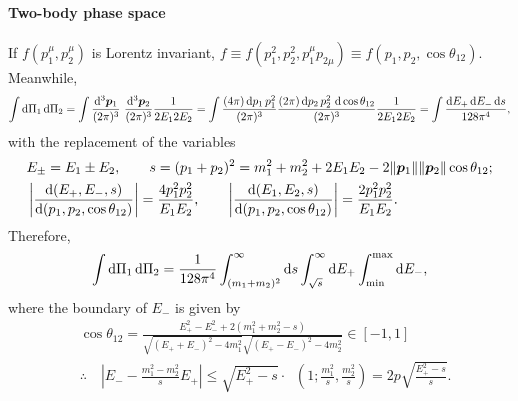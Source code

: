 \documentclass[CheatSheet]{subfiles}
\begin{document}
\paragraph{Two-body phase space}
If $f(p_1^\mu,p_2^\mu)$ is Lorentz invariant, $f\equiv f(p_1^2,p_2^2,p_1^\mu p_{2\mu})\equiv f(p_1,p_2,\cos\theta_{12})$.
Meanwhile,
\begin{equation}
 \int\dd\Pi_1\dd\Pi_2
=
\int\ddP{p_1}\,\,\ddP{p_2}\frac{1}{2E_12E_2}
=
\int\frac{(4\pi)\dd p_1\,p_1^2}{(2\pi)^3}
\frac{(2\pi)\dd p_2\,p_2^2\,\dd\cos\theta_{12}}{(2\pi)^3}\frac{1}{2E_12E_2}
=
\int\frac{\dd E_+\dd E_- \dd s}{128\pi^4},
\end{equation}
with the replacement of the variables
\begin{align*}
& E_\pm = E_1\pm E_2,
\qquad
s=(p_1+p_2)^2=m_1^2 + m_2^2 + 2E_1E_2 - 2\|{\boldsymbol{p}}_1\|\|{\boldsymbol{p}}_2\|\cos\theta_{12};\\
&
\left|\frac{\mathop{}\!\mathrm{d}(E_+,E_-,s)}{\mathop{}\!\mathrm{d}(p_1, p_2, \cos\theta_{12})}\right|=\frac{4p_1^2p_2^2}{E_1E_2},
\qquad
\left|\frac{\mathop{}\!\mathrm{d}(E_1,E_2,s)}{\mathop{}\!\mathrm{d}(p_1, p_2, \cos\theta_{12})}\right|=\frac{2p_1^2p_2^2}{E_1E_2}.
\end{align*}
Therefore, 
\begin{equation}
 \int\mathop{}\!\mathrm{d}\Pi_1\mathop{}\!\mathrm{d}\Pi_2
=
\frac{1}{128\pi^4}
\int_{(m_1+m_2)^2}^\infty\mathop{}\!\mathrm{d} s
\int_{\sqrt{s}}^\infty\mathop{}\!\mathrm{d} E_+
\int_{\text{min}}^{\mathrm{max}}\mathop{}\!\mathrm{d} E_-,
\end{equation}
where the boundary of $E_-$ is given by
\begin{align*}
 &\cos\theta_{12}=\frac{E_+^2-E_-^2+2 \left(m_1^2+m_2^2-s\right)}{\sqrt{(E_++E_-)^2-4 m_1^2}\sqrt{(E_+-E_-)^2-4 m_2^2}} \in [-1,1]\\
 &\therefore\quad
\left|E_- - \frac{m_1^2-m_2^2}{s}E_+\right| 
\le
\sqrt{E_+^2-s}\cdot\mathop{\lambda^{1/2}}\left(1;\frac{m_1^2}{s},\frac{m_2^2}{s}\right)
=
2p\sqrt{\frac{E_+^2-s}{s}}.
\end{align*}
\end{document}
